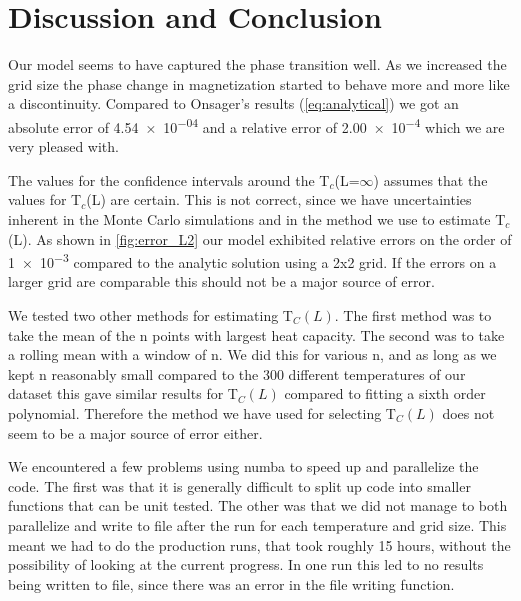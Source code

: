\newpage

\section{Discussion and Conclusion}

Our model seems to have captured the phase transition well. As we increased the
grid size the phase change in magnetization started to behave more and more like
a discontinuity.
Compared to Onsager's results (\cref{eq:analytical}) we got an absolute error
of \num{4.54e-04} and a relative error of \num{2.00e-4} which we are very
pleased with.

The values for the confidence intervals around the T$_c$(L=$\infty$) assumes
that the values for T$_c$(L) are certain. This is not correct, since we have
uncertainties inherent in the Monte Carlo simulations and in the method we use
to estimate T$_c$(L). As shown in \cref{fig:error_L2} our model exhibited
relative errors on the order of \num{1e-3} compared to the analytic solution
using a 2x2 grid. If the errors on a larger grid are comparable this should not
be a major source of error.

We tested two other methods for estimating T$_C(L)$. The first method was to
take the mean of the n points with largest heat capacity. The second was to take
a rolling mean with a window of n. We did this for various n, and as long as we
kept n reasonably small compared to the 300 different temperatures of our
dataset this gave similar results for T$_C(L)$ compared to fitting a sixth order
polynomial. Therefore the method we have used for selecting T$_C(L)$ does not
seem to be a major source of error either.




We encountered a few problems using numba to speed up and parallelize the code.
The first was that it is generally difficult to split up code into smaller
functions that can be unit tested. The other was that we did not manage to both
parallelize and write to file after the run for each temperature and grid size.
This meant we had to do the production runs, that took roughly 15 hours,
without the possibility of looking at the current progress. In one run this
led to no results being written to file, since there was an error in the file
writing function.
